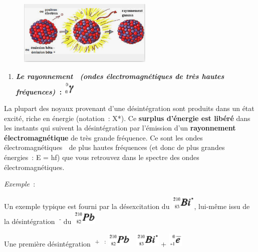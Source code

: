 \begin{figure}
\centering
\includegraphics[width=6.421cm,height=3.082cm]{Pictures/100000010000016C000000AF47CF8A96233610D0.png}
\caption{}
\end{figure}

\begin{enumerate}
\def\labelenumi{\alph{enumi})}
\tightlist
\item
  \emph{\textbf{Le rayonnement }\textbf{}\textbf{ (ondes
  électromagnétiques de très hautes fréquences)~}}\textbf{:
  }\includegraphics[width=0.565cm,height=0.683cm]{Pictures/10000001000000100000001384CE4DB1D643C8F9.png}
\end{enumerate}

La plupart des noyaux provenant d'une désintégration sont produits dans
un état excité, riche en énergie (notation~: X*). Ce \textbf{surplus
d'énergie est libéré }dans les instants qui suivent la désintégration
par l'émission d'un \textbf{rayonnement électromagnétique} de très
grande fréquence. Ce sont les ondes électromagnétiques  de plus hautes
fréquences (et donc de plus grandes énergies~: E = hf) que vous
retrouvez dans le spectre des ondes électromagnétiques.

\emph{Exemple~}:

Un exemple typique est fourni par la désexcitation du
\includegraphics[width=1.177cm,height=0.683cm]{Pictures/100000010000002100000013F4346A116177CC55.png},
lui-même issu de la désintégration \textsuperscript{- }du
\includegraphics[width=1.13cm,height=0.683cm]{Pictures/100000010000002000000013EC637266C7BF3BB2.png}

Une première désintégration \textsuperscript{+~ : }
\includegraphics[width=1.13cm,height=0.683cm]{Pictures/100000010000002000000013EC637266C7BF3BB2.png}

\includegraphics[width=1.177cm,height=0.683cm]{Pictures/100000010000002100000013F4346A116177CC55.png}
+
\includegraphics[width=0.706cm,height=0.683cm]{Pictures/1000000100000014000000131B1712312E317641.png}

